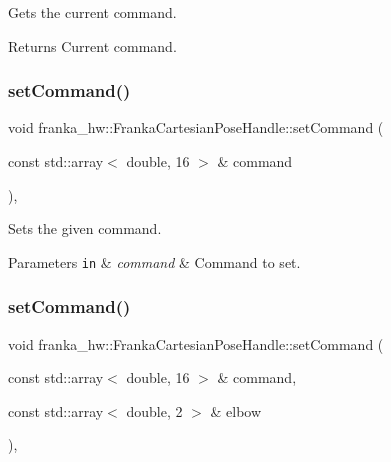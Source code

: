 Gets the current command.

\begin{DoxyReturn}{Returns}
Current command. 
\end{DoxyReturn}
\mbox{\label{classfranka__hw_1_1_franka_cartesian_pose_handle_a37b091755da28b088892e79c984e0634}} 
\subsubsection{\texorpdfstring{set\+Command()}{setCommand()}\hspace{0.1cm}{\footnotesize\ttfamily [1/2]}}
{\footnotesize\ttfamily void franka\+\_\+hw\+::\+Franka\+Cartesian\+Pose\+Handle\+::set\+Command (\begin{DoxyParamCaption}\item[{const std\+::array$<$ double, 16 $>$ \&}]{command }\end{DoxyParamCaption})\hspace{0.3cm}{\ttfamily [inline]}, {\ttfamily [noexcept]}}

Sets the given command.


\begin{DoxyParams}[1]{Parameters}
\mbox{\tt in}  & {\em command} & Command to set. \\
\hline
\end{DoxyParams}
\mbox{\label{classfranka__hw_1_1_franka_cartesian_pose_handle_a0a10bbd38414170da45412dc803cb428}} 
\subsubsection{\texorpdfstring{set\+Command()}{setCommand()}\hspace{0.1cm}{\footnotesize\ttfamily [2/2]}}
{\footnotesize\ttfamily void franka\+\_\+hw\+::\+Franka\+Cartesian\+Pose\+Handle\+::set\+Command (\begin{DoxyParamCaption}\item[{const std\+::array$<$ double, 16 $>$ \&}]{command,  }\item[{const std\+::array$<$ double, 2 $>$ \&}]{elbow }\end{DoxyParamCaption})\hspace{0.3cm}{\ttfamily [inline]}, {\ttfamily [noexcept]}}

